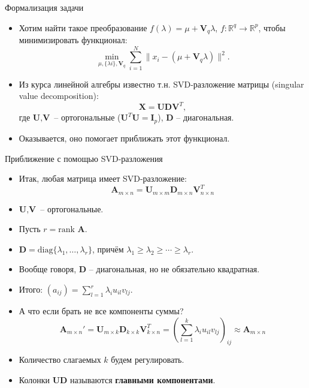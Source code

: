\documentclass[9pt]{beamer}
\begin{document}
\begin{frame}{Формализация задачи}
\begin{itemize}
    \item Хотим найти такое преобразование $f(\lambda)=\mu + \textbf{V}_q\lambda$, $f: \mathbb{R}^q \rightarrow \mathbb{R}^p$, чтобы минимизировать функционал:
    \begin{equation}\label{pca_min}\min_{\mu, \{\lambda i\}, \textbf{V}_q} \sum_{i=1}^N \|x_i - (\mu + \textbf{V}_q\lambda)\|^2.\end{equation}
    \item Из курса линейной алгебры известно т.н. SVD-разложение матрицы (singular value decomposition):
    $$\textbf{X} = \textbf{U}\textbf{D}\textbf{V}^T,$$
    где $\textbf{U}, \textbf{V}$ -- ортогональные ($\textbf{U}^T\textbf{U}=\textbf{I}_p$), $\textbf{D}$ -- диагональная.
    \item Оказывается, оно помогает приближать этот функционал.
\end{itemize}
    
\end{frame}

\begin{frame}{Приближение с помощью SVD-разложения}
    \begin{itemize}
        \item Итак, любая матрица имеет SVD-разложение:
        $$\textbf{A}_{m\times n} = \textbf{U}_{m\times m} \textbf{D}_{m\times n} \textbf{V}^T_{n\times n}$$
        \item $\textbf{U}, \textbf{V}$ -- ортогональные.
        \item Пусть $r = \text{rank } \textbf{A}$.
        \item $\textbf{D} = \text{diag}\{\lambda_1, \ldots, \lambda_r \}$, причём $\lambda_1 \geq \lambda_2 \geq \cdots \geq \lambda_r$.
        \item Вообще говоря, $\textbf{D}$ -- диагональная, но не обязательно квадратная.
        \item Итого: $(a_{ij}) = \sum\limits_{l=1}^r \lambda_i u_{il}v_{lj}$. 
        \item А что если брать не все компоненты суммы?
        $$\textbf{A}_{m\times n}' = \textbf{U}_{m\times k} \textbf{D}_{k\times k} \textbf{V}^T_{k\times n} = \left( \sum\limits_{l=1}^k \lambda_i u_{il}v_{lj}\right)_{ij} \approx \textbf{A}_{m\times n}$$
        \item Количество слагаемых $k$ будем регулировать.
        \item Колонки $\textbf{UD}$ называются \textbf{главными компонентами}.
    \end{itemize}
\end{frame}
\end{document}
